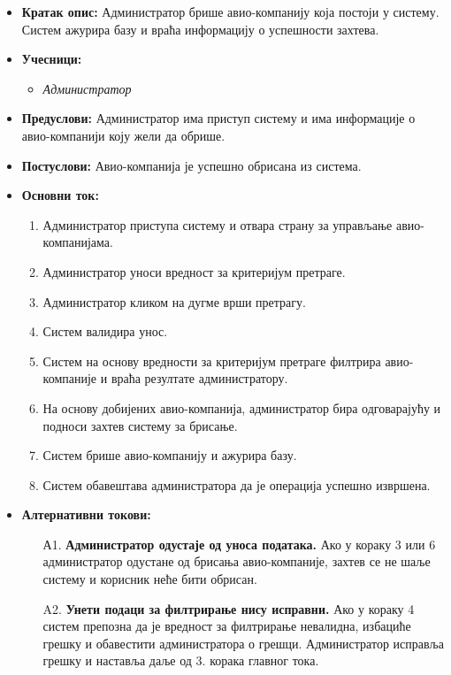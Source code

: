 \documentclass{article}
\begin{document}
\begin{itemize}
    \item \textbf{Кратак опис:} Администратор брише авио-компанију која постоји у систему. Систем ажурира базу и враћа информацију о успешности захтева.
    \item \textbf{Учесници:}
        \begin{itemize}
            \item \textit{Администратор}
        \end{itemize}
    \item \textbf{Предуслови:} Администратор има приступ систему и има информације о авио-компанији коју жели да обрише.
    \item \textbf{Постуслови:} Авио-компанија је успешно обрисана из система.
    \item \textbf{Основни ток:}
        \begin{enumerate}
            \item Администратор приступа систему и отвара страну за управљање авио-компанијама.
            \item Администратор уноси вредност за критеријум претраге.
            \item Администратор кликом на дугме врши претрагу.
            \item Систем валидира унос.
            \item Систем на основу вредности за критеријум претраге филтрира авио-компаније и враћа резултате администратору.
            \item На основу добијених авио-компанија, администратор бира одговарајућу и подноси захтев систему за брисање.
            \item Систем брише авио-компанију и ажурира базу.
            \item Систем обавештава администратора да је операција успешно извршена.
        \end{enumerate}
    
    \item \textbf{Алтернативни токови:}
        \begin{itemize}
            \item[А1.] \textbf{Администратор одустаје од уноса података.} Ако у кораку 3 или 6 администратор одустане од брисања авио-компаније, захтев се не шаље систему и корисник неће бити обрисан.
            \item[A2.] \textbf{Унети подаци за филтрирање нису исправни.} Ако у кораку 4 систем препозна да је вредност за филтрирање невалидна, избациће грешку и обавестити администратора о грешци. Администратор исправља грешку и наставља даље од 3. корака главног тока. 
        \end{itemize}
\end{itemize}
\end{document}
